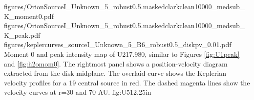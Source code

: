 \documentclass[twocolumn]{aastex61}
\begin{document}
\FigureThree
{{figures/OrionSourceI_Unknown_5_robust0.5.maskedclarkclean10000_medsub_K_moment0}.pdf}
{{figures/OrionSourceI_Unknown_5_robust0.5.maskedclarkclean10000_medsub_K_peak}.pdf}
{{figures/keplercurves_sourceI_Unknown_5_B6_robust0.5_diskpv_0.01}.pdf}
{Moment 0 and peak intensity map of U217.980, similar to Figures \ref{fig:U1peak} and \ref{fig:h2omom0}.
The rightmost panel shows a position-velocity diagram extracted from the disk midplane.
The overlaid  curve shows the Keplerian velocity profiles for a 19 \msun central source in red.
The dashed magenta lines show the velocity curves at r=30 and 70 AU.
}
{fig:U5}{1}{2.25in}
\end{document}
